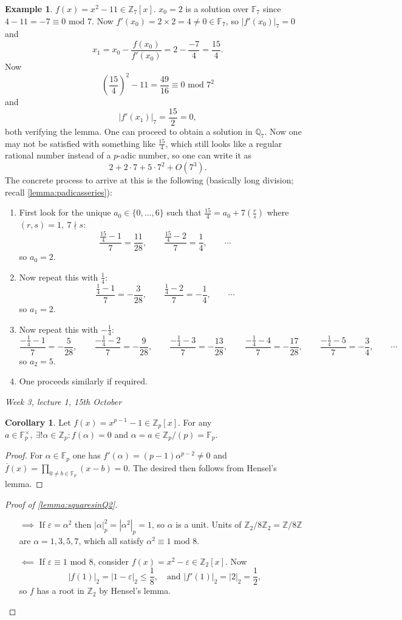 \documentclass{article}
\newcommand{\F}{\mathbb{F}}
\newcommand{\Z}{\mathbb{Z}}
\newcommand{\Q}{\mathbb{Q}}
\newcommand{\Mod}{\text{ mod }}
\theoremstyle{definition}
\newtheorem{coro}[defn]{Corollary}
\newtheorem{example}[defn]{Example}
\begin{document}
\begin{example}
$f(x)=x^2-11\in\Z_7[x]$. $x_0=2$ is a solution over $\F_7$ since $4-11=-7\equiv 0\Mod 7$. Now $f'(x_0)=2\times 2=4\neq 0\in\F_7$, so $|f'(x_0)|_7=0$ and
\[
x_1=x_0-\frac{f(x_0)}{f'(x_0)}=2-\frac{-7}{4}=\frac{15}{4}.
\]
Now
\[
\left(\frac{15}{4}\right)^2-11=\frac{49}{16}\equiv 0\Mod 7^2
\]
and
\[
|f'(x_1)|_7=\frac{15}{2}=0,
\]
both verifying the lemma. One can proceed to obtain a solution in $\Q_7$. Now one may not be satisfied with something like $\frac{15}{4}$, which still looks like a regular rational number instead of a $p$-adic number, so one can write it as
\[
2+2\cdot 7+5\cdot 7^2+O(7^3).
\]
The concrete process to arrive at this is the following (basically long division; recall \ref{lemma:padicasseries}):
\begin{enumerate}
\item First look for the unique $a_0\in\{0,\ldots,6\}$ such that $\frac{15}{4}=a_0+7\left(\frac{r}{s}\right)$ where $(r,s)=1,\ 7\nmid s$:
\[
\frac{\frac{15}{4}-1}{7}=\frac{11}{28},\qquad
\frac{\frac{15}{4}-2}{7}=\frac{1}{4},\qquad\cdots
\]
so $a_0=2$.
\item Now repeat this with $\frac14$:
\[
\frac{\frac14-1}{7}=-\frac{3}{28},\qquad \frac{\frac14-2}{7}=-\frac{1}{4},\qquad\cdots
\]
so $a_1=2$.
\item Now repeat this with $-\frac14$:
\[
\frac{-\frac14-1}{7}=-\frac{5}{28},\qquad \frac{-\frac14-2}{7}=-\frac{9}{28},\qquad \frac{-\frac14-3}{7}=-\frac{13}{28},\qquad \frac{-\frac14-4}{7}=-\frac{17}{28},\qquad \frac{-\frac14-5}{7}=-\frac{3}{4},\qquad\cdots
\]
so $a_2=5$.
\item One proceeds similarly if required.
\end{enumerate}
\end{example}

\begin{flushright}
\textit{Week 3, lecture 1, 15th October}
\end{flushright}

\begin{coro}
Let $f(x)=x^{p-1}-1\in\Z_p[x]$. For any $a\in\F_p^\times,\ \exists!\alpha\in\Z_p:f(\alpha)=0$ and $\alpha=a\in\Z_p/(p)=\F_p$.
\end{coro}
\begin{proof}
For $\alpha\in\F_p$ one has $f'(\alpha)=(p-1)\alpha^{p-2}\neq 0$ and $\overline f(x)=\prod_{0\neq b\in\F_p}(x-b)=0$. The desired then follows from Hensel's lemma.
\end{proof}

\begin{proof}[Proof of \ref{lemma:squaresinQ2}]
\begin{itemize}
\item[$\implies$] If $\varepsilon=\alpha^2$ then $|\alpha|_p^2=|\alpha^2|_p=1$, so $\alpha$ is a unit. Units of $\Z_2/8\Z_2=\Z/8\Z$ are $\alpha=1,3,5,7$, which all satisfy $\alpha^2\equiv 1\Mod 8$.
\item[$\impliedby$] If $\varepsilon\equiv 1\Mod 8$, consider $f(x)=x^2-\varepsilon\in\Z_2[x]$. Now
\[
|f(1)|_2=|1-\varepsilon|_2\leq\frac18,\quad\text{and } |f'(1)|_2=|2|_2=\frac12,
\]
so $f$ has a root in $\Z_2$ by Hensel's lemma.
\end{itemize}
\end{proof}
\end{document}
